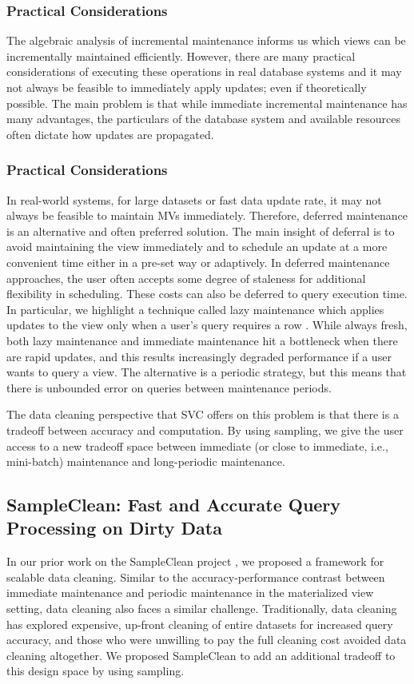 \subsubsection{Practical Considerations}
The algebraic analysis of incremental maintenance \cite{DBLP:journals/vldb/KochAKNNLS14, DBLP:conf/pods/Koch10} informs us which views can be incrementally maintained efficiently.
However, there are many practical considerations of executing these operations in real database systems and it may not always be feasible to immediately apply updates; even if theoretically possible.
The main problem is that while immediate incremental maintenance has many advantages, the particulars of the database system and available resources often dictate how updates are propagated. 

\fi

\subsubsection{Practical Considerations}

In real-world systems, for large datasets or fast data update rate, it may not always be feasible to maintain MVs immediately. Therefore, deferred maintenance is an alternative and often preferred solution.
The main insight of deferral is to avoid maintaining the view immediately and to schedule an update at a more convenient time either in a pre-set way or adaptively.
In deferred maintenance approaches, the user often accepts some degree of staleness for additional flexibility in scheduling.
These costs can also be deferred to query execution time.
In particular, we highlight a technique called lazy maintenance which applies updates to the view only when a user's query requires a row \cite{zhou2007lazy}.
While always fresh, both lazy maintenance and immediate maintenance hit a bottleneck when there are rapid updates, and this results increasingly degraded performance if a user wants to query a view.
The alternative is a periodic strategy, but this means that there is unbounded error on queries between maintenance periods.

The data cleaning perspective that SVC offers on this problem is that there is a tradeoff between accuracy and computation.
By using sampling, we give the user access to a new tradeoff space between immediate (or close to immediate, i.e., mini-batch) maintenance and long-periodic maintenance.

\subsection{SampleClean: Fast and Accurate Query Processing on Dirty Data}
In our prior work on the SampleClean project \cite{wang1999sample}, we proposed a framework for scalable data cleaning.
Similar to the accuracy-performance contrast between immediate maintenance and periodic maintenance in the materialized view setting, data cleaning also faces a similar challenge.
Traditionally, data cleaning has explored expensive, up-front cleaning of entire datasets for increased query accuracy, and those who were unwilling to pay the full cleaning cost avoided data cleaning altogether.
We proposed SampleClean to add an additional tradeoff to this design space by using sampling.

